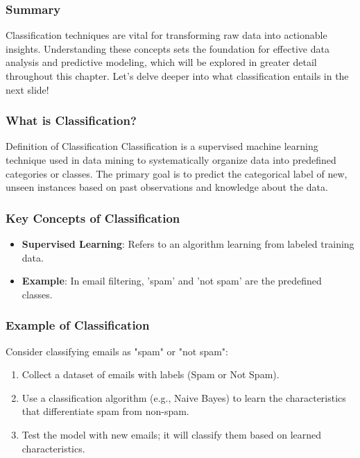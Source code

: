 \documentclass{beamer}
\begin{document}
\begin{frame}[fragile]
    \frametitle{Summary}
    Classification techniques are vital for transforming raw data into actionable insights. Understanding these concepts sets the foundation for effective data analysis and predictive modeling, which will be explored in greater detail throughout this chapter. Let's delve deeper into what classification entails in the next slide!
\end{frame}

\begin{frame}[fragile]
    \frametitle{What is Classification?}
    \begin{block}{Definition of Classification}
        Classification is a supervised machine learning technique used in data mining 
        to systematically organize data into predefined categories or classes. The 
        primary goal is to predict the categorical label of new, unseen instances based 
        on past observations and knowledge about the data.
    \end{block}
\end{frame}

\begin{frame}[fragile]
    \frametitle{Key Concepts of Classification}
    \begin{itemize}
        \item \textbf{Supervised Learning}: Refers to an algorithm learning from labeled 
        training data. 
        \item \textbf{Example}: In email filtering, 'spam' and 'not spam' are the 
        predefined classes.
    \end{itemize}
\end{frame}

\begin{frame}[fragile]
    \frametitle{Example of Classification}
    Consider classifying emails as "spam" or "not spam":
    \begin{enumerate}
        \item Collect a dataset of emails with labels (Spam or Not Spam).
        \item Use a classification algorithm (e.g., Naive Bayes) to learn the 
        characteristics that differentiate spam from non-spam.
        \item Test the model with new emails; it will classify them based on learned 
        characteristics.
    \end{enumerate}
\end{frame}
\end{document}
